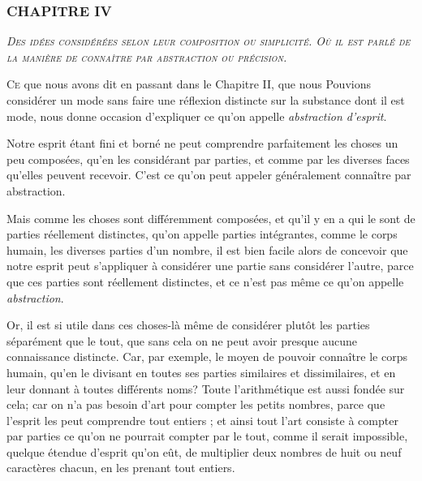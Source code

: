 \subsubsection{\centering \Large CHAPITRE IV}

\begin{center}\emph{\large\scshape Des idées considérées selon leur composition ou simplicité. Où il est parlé de la manière de connaître par abstraction ou précision.}\end{center}

	\lettrine{C}{e} que nous avons dit en passant dans le Chapitre II, que nous Pouvions considérer un mode sans faire une réflexion distincte sur la substance dont il est mode, nous donne occasion d'expliquer ce qu'on appelle \emph{abstraction d'esprit}.

Notre esprit étant fini et borné ne peut comprendre parfaitement les choses un peu composées, qu'en les considérant par parties, et comme par les diverses faces qu'elles peuvent recevoir. C'est ce qu'on peut appeler généralement connaître par abstraction.

Mais comme les choses sont différemment composées, et qu'il y en a qui le sont de parties réellement distinctes, qu'on appelle parties intégrantes, comme le corps humain, les diverses parties d'un nombre, il est bien facile alors de concevoir que notre esprit peut s'appliquer à considérer une partie sans considérer l'autre, parce que ces parties sont réellement distinctes, et ce n'est pas même ce qu'on appelle \emph{abstraction}.

Or, il est si utile dans ces choses-là même de considérer plutôt les parties séparément que le tout, que sans cela on ne peut avoir presque aucune connaissance distincte. Car, par exemple, le moyen de pouvoir connaître le corps humain, qu'en le divisant en toutes ses parties similaires et dissimilaires, et en leur donnant à toutes différents noms? Toute l'arithmétique est aussi fondée sur cela; car on n'a pas besoin d'art pour compter les petits nombres, parce que l'esprit les peut comprendre tout entiers ; et ainsi tout l'art consiste à compter par parties ce qu'on ne pourrait compter par le tout, comme il serait impossible, quelque étendue d'esprit qu'on eût, de multiplier deux nombres de huit ou neuf caractères chacun, en les prenant tout entiers.

